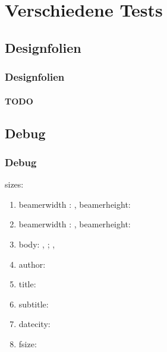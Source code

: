 \documentclass[german,notoc,draft]{tudbeamer}%
\begin{document}
\section{Verschiedene Tests}	
\subsection{Designfolien}

\begin{frame}
	\frametitle{Designfolien}
	\framesubtitle{TODO}
\end{frame}


\subsection{Debug}
\makeatletter
\begin{frame}[allowframebreaks]
	\frametitle{Debug}
	sizes:
	\begin{enumerate}
		\item beamerwidth : \the\paperwidth, beamerheight: \the\paperheight
		\item beamerwidth : \number\paperwidth, beamerheight:\number\paperheight
		\item body: \the\bodyx, \the\bodyy; \the\bodywidth, \the\bodywidth
		\item author: \insertauthor
		\item title: \inserttitle
		\item subtitle: \insertsubtitle
		\item datecity: \insertdatecity
		\item fsize: \f@size
	\end{enumerate}
\end{frame}
\makeatother

%
%

\disableSectionFrame%
\end{document}
